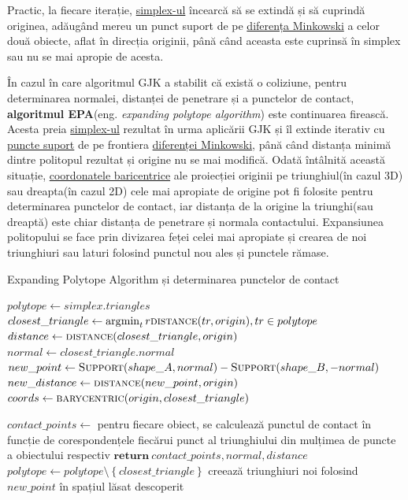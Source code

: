 \documentclass[12pt,a4paper]{report}
\DeclareMathOperator*{\argmin}{\arg\!\min}
\begin{document}
Practic, la fiecare iterație, \hyperref[simplex]{simplex-ul} încearcă să se extindă și să cuprindă originea, adăugând mereu un punct suport de pe \hyperref[minkowski_difference]{diferența Minkowski} a celor două obiecte, aflat în direcția originii, până când aceasta este cuprinsă în simplex sau nu se mai apropie de acesta.



În cazul în care algoritmul GJK a stabilit că există o coliziune, pentru determinarea normalei, distanței de penetrare și a punctelor de contact, \textbf{algoritmul EPA}\cite{epa_gino}(eng. \textit{expanding polytope algorithm}) este continuarea firească. Acesta preia \hyperref[simplex]{simplex-ul} rezultat în urma aplicării GJK și îl extinde iterativ cu \hyperref[support_points]{puncte suport} de pe frontiera \hyperref[minkowski_difference]{diferenței Minkowski}, până când distanța minimă dintre politopul rezultat și origine nu se mai modifică. Odată întâlnită această situație, \hyperref[barycenric_coordinates]{coordonatele baricentrice} ale proiecției originii pe triunghiul(în cazul 3D) sau dreapta(în cazul 2D) cele mai apropiate de origine pot fi folosite pentru determinarea punctelor de contact, iar distanța de la origine la triunghi(sau dreaptă) este chiar distanța de penetrare și normala contactului. Expansiunea politopului se face prin divizarea feței celei mai apropiate și crearea de noi triunghiuri sau laturi folosind punctul nou ales și punctele rămase.

\begin{algorithm}[]
	\footnotesize
	\linespread{0.9}\selectfont
	\caption{Expanding Polytope Algorithm și determinarea punctelor de contact}
	\label{epa}
	\begin{algorithmic}[0]
			\State $ polytope \gets simplex.triangles $
			\Loop
				\State $ closest\_triangle \gets \argmin_tr \textproc{distance}(tr, origin), tr \in polytope $
				\State $ distance \gets \textproc{distance}(closest\_triangle, origin) $
				\State $ normal \gets closest\_triangle.normal $
				\State $ new\_point \gets \textproc{Support}(shape\_A, normal) - \textproc{Support}(shape\_B, -normal) $
				\State $ new\_distance \gets \textproc{distance}(new\_point, origin) $
					\State $ coords \gets \textproc{barycentric}(origin, closest\_triangle) $
					
				\State	$ contact\_points \gets $ pentru fiecare obiect, se calculează punctul de contact în funcție de corespondențele fiecărui punct al triunghiului din mulțimea de puncte a obiectului respectiv
				\State $ \textbf{return}\ contact\_points, normal, distance $
				\EndIf
				\State $ polytope \gets polytope \setminus \left\lbrace closest\_triangle \right\rbrace $
				\State creează triunghiuri noi folosind $ new\_point $ în spațiul lăsat descoperit
			\EndLoop
		\EndFunction
	\end{algorithmic}
\end{algorithm}
\end{document}
